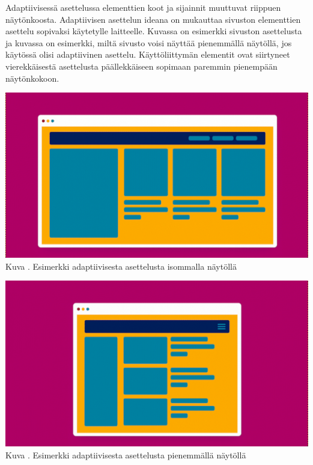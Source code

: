 \documentclass[11pt,a4paper,titlepage,oneside]{article}
\begin{document}
Adaptiivisessä asettelussa elementtien koot ja sijainnit muuttuvat riippuen näytönkoosta.
Adaptiivisen asettelun ideana on mukauttaa sivuston elementtien asettelu sopivaksi käytetylle laitteelle.
Kuvassa \nextImageCount {} on esimerkki sivuston asettelusta ja
kuvassa \nextnextImageCount{} on esimerkki, miltä sivusto voisi näyttää pienemmällä näytöllä, jos käytössä olisi adaptiivinen asettelu.
Käyttöliittymän elementit ovat siirtyneet vierekkäisestä asettelusta päällekkäiseen sopimaan paremmin pienempään näytönkokoon.
\medskip


\bigskip
\includegraphics[width = 15cm]{src/public/oppar/adaptiveBig.png}\\
Kuva \getImgCount {}. Esimerkki adaptiivisesta asettelusta isommalla näytöllä 
 
\bigskip

\includegraphics[width = 15cm]{src/public/oppar/adaptivesmall.png}\\
Kuva \getImgCount {}. Esimerkki adaptiivisesta asettelusta pienemmällä näytöllä
\end{document}
